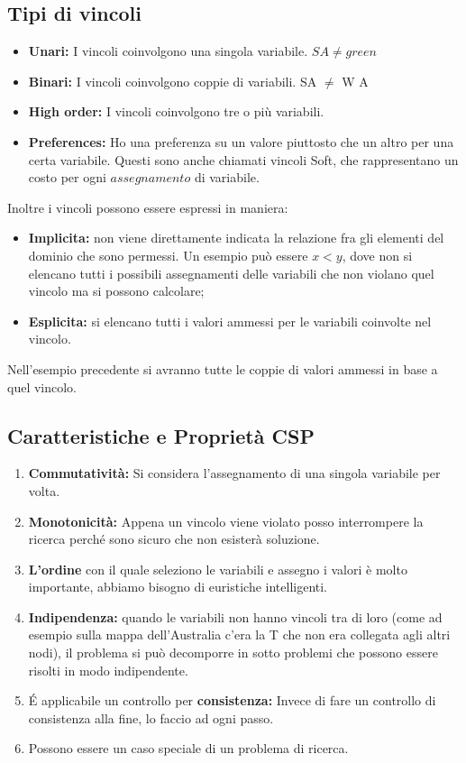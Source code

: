\subsection{Tipi di vincoli}
\begin{itemize}
    \item \textbf{Unari:} I vincoli coinvolgono una singola variabile. $SA \neq
              green$
    \item \textbf{Binari:} I vincoli coinvolgono coppie di variabili. SA $\neq$
          W A
    \item \textbf{High order:} I vincoli coinvolgono tre o più variabili.
    \item \textbf{Preferences:} Ho una preferenza su un valore piuttosto che un
          altro per una certa variabile. Questi sono anche chiamati vincoli Soft, che
          rappresentano un costo per ogni $assegnamento$ di variabile.
\end{itemize}
Inoltre i vincoli possono essere espressi in maniera:
\begin{itemize}
    \item \textbf{Implicita:} non viene direttamente indicata la relazione fra
          gli elementi del dominio che sono permessi. Un esempio può essere $x<y$, dove
          non si elencano tutti i possibili assegnamenti delle variabili che non
          violano quel vincolo ma si possono calcolare;
    \item \textbf{Esplicita:} si elencano tutti i valori ammessi per le
          variabili coinvolte nel vincolo.
\end{itemize}
Nell'esempio precedente si avranno tutte le coppie di valori ammessi in base a
quel vincolo.

\subsection{Caratteristiche e Proprietà CSP}
\begin{enumerate}
    \item \textbf{Commutatività:} Si considera l'assegnamento di una singola
          variabile per volta.
    \item \textbf{Monotonicità:} Appena un vincolo viene violato posso
          interrompere la ricerca perché sono sicuro che non esisterà soluzione.
    \item \textbf{L'ordine} con il quale seleziono le variabili e assegno i
          valori è molto importante, abbiamo bisogno di euristiche intelligenti.
    \item \textbf{Indipendenza:} quando le variabili non hanno vincoli tra di
          loro (come ad esempio sulla mappa dell'Australia c'era la T che non era
          collegata agli altri nodi), il problema si può decomporre in sotto problemi
          che possono essere risolti in modo indipendente.
    \item É applicabile un controllo per \textbf{consistenza:} Invece di fare un
          controllo di consistenza alla fine, lo faccio ad ogni passo.
    \item Possono essere un caso speciale di un problema di ricerca.
\end{enumerate}

